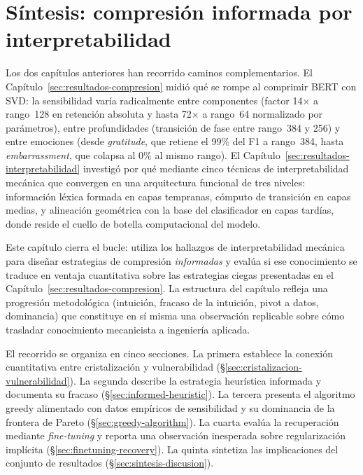 
\section{Síntesis: compresión informada por interpretabilidad}
\label{sec:sintesis}

Los dos capítulos anteriores han recorrido caminos complementarios. El
Capítulo~\ref{sec:resultados-compresion} midió qué se rompe al
comprimir BERT con SVD: la sensibilidad varía radicalmente entre
componentes (factor 14$\times$ a rango~128 en retención absoluta y hasta
72$\times$ a rango~64 normalizado por parámetros), entre profundidades
(transición de fase entre rango~384 y 256) y entre emociones (desde
\emph{gratitude}, que retiene el 99\% del F1 a rango~384, hasta
\emph{embarrassment}, que colapsa al 0\% al mismo rango). El
Capítulo~\ref{sec:resultados-interpretabilidad} investigó por qué
mediante cinco técnicas de interpretabilidad mecánica que convergen en una
arquitectura funcional de tres niveles: información léxica formada en
capas tempranas, cómputo de transición en capas medias, y alineación
geométrica con la base del clasificador en capas tardías, donde reside el
cuello de botella computacional del modelo.

Este capítulo cierra el bucle: utiliza los hallazgos de interpretabilidad
mecánica para diseñar estrategias de compresión \emph{informadas} y evalúa
si ese conocimiento se traduce en ventaja cuantitativa sobre las
estrategias ciegas presentadas en el
Capítulo~\ref{sec:resultados-compresion}. La estructura del capítulo
refleja una progresión metodológica (intuición, fracaso de la
intuición, pivot a datos, dominancia) que constituye en sí misma una
observación replicable sobre cómo trasladar conocimiento mecanicista a
ingeniería aplicada.

El recorrido se organiza en cinco secciones. La primera establece la
conexión cuantitativa entre cristalización y vulnerabilidad
(\S\ref{sec:cristalizacion-vulnerabilidad}). La segunda describe la
estrategia heurística informada y documenta su fracaso
(\S\ref{sec:informed-heuristic}). La tercera presenta el algoritmo greedy
alimentado con datos empíricos de sensibilidad y su dominancia de la
frontera de Pareto (\S\ref{sec:greedy-algorithm}). La cuarta evalúa la
recuperación mediante \emph{fine-tuning} y reporta una observación inesperada
sobre regularización implícita (\S\ref{sec:finetuning-recovery}). La quinta
sintetiza las implicaciones del conjunto de resultados
(\S\ref{sec:sintesis-discusion}).


